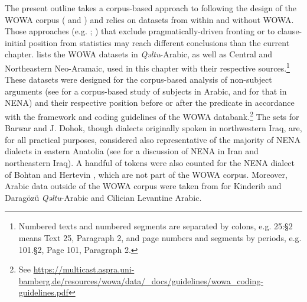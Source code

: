\documentclass[output=paper,colorlinks,citecolor=brown,draftmode]{langscibook}
\begin{document}
\begin{sloppypar}
The present outline takes a corpus-based approach to  following the design of the WOWA corpus (\citealt{Haig.Stilo.Dogan.Schiborr2022} and ) and relies on datasets from within and without WOWA. Those approaches (e.g. \citealt{Dahlgren1998WOA}; \citealt{ElZarkaZiagos2020WOCA}) that exclude pragmatically-driven fronting or  to clause-initial position from  statistics may reach different conclusions than the current chapter.  lists the WOWA datasets in \textit{Qəltu}-Arabic, as well as Central and Northeastern Neo-Aramaic, used in this chapter with their respective sources.\footnote{Numbered texts and numbered segments are separated by colons, e.g. 25:§2 means Text 25, Paragraph 2, and page numbers and segments by periods, e.g. 101.§2, Page 101, Paragraph 2.} These datasets were designed for the corpus-based analysis of non-subject arguments (see \citealt{Dahlgren1998WOA} for a corpus-based study of subjects in Arabic, and \citealt{Molin2021Dohok} for that in NENA) and their respective position before or after the predicate in accordance with the framework and coding guidelines of the WOWA databank.\footnote{See \url{https://multicast.aspra.uni-bamberg.de/resources/wowa/data/_docs/guidelines/wowa_coding-guidelines.pdf}} The sets for Barwar and J. Dohok, though dialects originally spoken in northwestern Iraq, are, for all practical purposes, considered also representative of the majority of NENA dialects in eastern Anatolia (see  for a discussion of NENA in Iran and northeastern Iraq). A handful of  tokens were also counted for the NENA dialect of Bohtan \citep[116--137]{Fox2009NABohtan} and Hertevin \citep{Jastrow1988NAHertevin}, which are not part of the WOWA corpus. Moreover, Arabic data outside of the WOWA corpus were taken from \citet{Noorlander2024OVArabi} for Kinderib and Daragözü \textit{Qəltu}-Arabic and Cilician Levantine Arabic.
\end{sloppypar}
\end{document}
